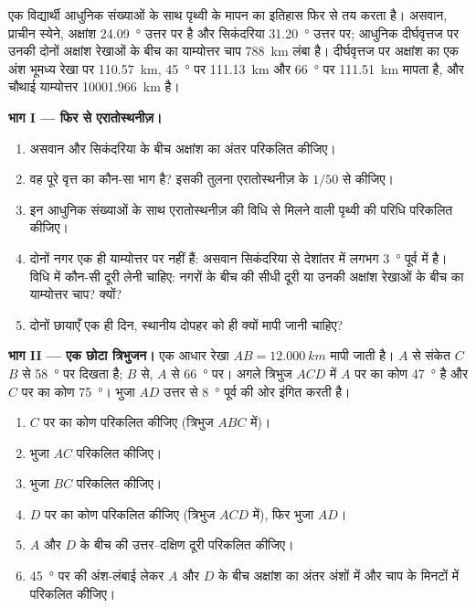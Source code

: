 \begin{problem}
\label{pb:g10:measuring-the-earth:1}
एक विद्यार्थी आधुनिक संख्याओं के साथ पृथ्वी के मापन का इतिहास फिर से तय करता है।
असवान, प्राचीन स्येने, अक्षांश
\qty{24.09}{\degree} उत्तर पर है और सिकंदरिया \qty{31.20}{\degree} उत्तर पर;
आधुनिक दीर्घवृत्तज पर उनकी दोनों अक्षांश रेखाओं के बीच का याम्योत्तर चाप
\qty{788}{km} लंबा है। दीर्घवृत्तज पर अक्षांश का एक अंश भूमध्य रेखा पर
\qty{110.57}{km}, \qty{45}{\degree} पर \qty{111.13}{km} और
\qty{66}{\degree} पर \qty{111.51}{km} मापता है, और चौथाई याम्योत्तर
\qty{10001.966}{km} है।

\medskip
\noindent\textbf{भाग I --- फिर से एरातोस्थनीज़।}
\begin{enumerate}
  \item असवान और सिकंदरिया के बीच अक्षांश का अंतर परिकलित कीजिए।
  \item वह पूरे वृत्त का कौन-सा भाग है? इसकी तुलना एरातोस्थनीज़ के
        $1/50$ से कीजिए।
  \item इन आधुनिक संख्याओं के साथ एरातोस्थनीज़ की विधि से मिलने वाली पृथ्वी की
        परिधि परिकलित कीजिए।
  \item दोनों नगर एक ही याम्योत्तर पर नहीं हैं: असवान सिकंदरिया से देशांतर में लगभग
        \qty{3}{\degree} पूर्व में है। विधि में कौन-सी दूरी लेनी
        चाहिए: नगरों के बीच की सीधी दूरी या उनकी अक्षांश रेखाओं के बीच का याम्योत्तर
        चाप? क्यों?
  \item दोनों छायाएँ एक ही दिन, स्थानीय दोपहर को ही क्यों मापी जानी चाहिए?
\end{enumerate}

\medskip
\noindent\textbf{भाग II --- एक छोटा त्रिभुजन।}
एक आधार रेखा $AB = \qty{12.000}{km}$ मापी जाती है। $A$ से संकेत $C$
$B$ से \qty{58}{\degree} पर दिखता है; $B$ से, $A$ से \qty{66}{\degree} पर।
अगले त्रिभुज $ACD$ में $A$ पर का कोण \qty{47}{\degree} है और
$C$ पर का कोण \qty{75}{\degree}। भुजा $AD$ उत्तर से \qty{8}{\degree}
पूर्व की ओर इंगित करती है।
\begin{enumerate}[resume]
  \item $C$ पर का कोण परिकलित कीजिए (त्रिभुज $ABC$ में)।
  \item भुजा $AC$ परिकलित कीजिए।
  \item भुजा $BC$ परिकलित कीजिए।
  \item $D$ पर का कोण परिकलित कीजिए (त्रिभुज $ACD$ में), फिर भुजा $AD$।
  \item $A$ और $D$ के बीच की उत्तर--दक्षिण दूरी परिकलित कीजिए।
  \item \qty{45}{\degree} पर की अंश-लंबाई लेकर $A$ और $D$ के बीच अक्षांश का अंतर
        अंशों में और चाप के मिनटों में
        परिकलित कीजिए।
\end{enumerate}


\end{problem}
